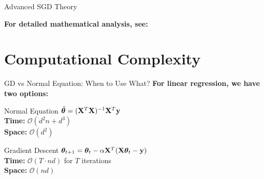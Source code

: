 \documentclass[usenames,dvipsnames]{beamer}
\begin{document}
  \begin{frame}{Advanced SGD Theory}
    \begin{center}
    \textbf{For detailed mathematical analysis, see:}
    \end{center}
    
  \end{frame}

  \section{Computational Complexity}

  \begin{frame}{GD vs Normal Equation: When to Use What?}
    \textbf{For linear regression, we have two options:}
    
    \begin{alertbox}{Normal Equation}
    $\hat{\boldsymbol{\theta}} = (\mathbf{X}^T\mathbf{X})^{-1}\mathbf{X}^T\mathbf{y}$
    \\\textbf{Time:} $\mathcal{O}(d^2n + d^3)$
    \\\textbf{Space:} $\mathcal{O}(d^2)$ 
    \end{alertbox}
    
    \pause
    \begin{keypointsbox}{Gradient Descent}  
    $\boldsymbol{\theta}_{t+1} = \boldsymbol{\theta}_t - \alpha \mathbf{X}^T(\mathbf{X}\boldsymbol{\theta}_t - \mathbf{y})$
    \\\textbf{Time:} $\mathcal{O}(T \cdot nd)$ for $T$ iterations
    \\\textbf{Space:} $\mathcal{O}(nd)$
    \end{keypointsbox}
  \end{frame}
\end{document}
